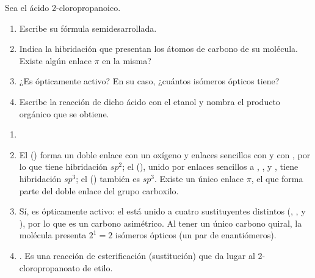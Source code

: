 \begin{exerciseEVAU}
    Sea el ácido 2-cloropropanoico.

    \begin{enumerate}[label=\letraminuscula]
        \item Escribe su fórmula semidesarrollada.
        \item Indica la hibridación que presentan los átomos de carbono de su molécula. Existe algún enlace \(\pi\) en la misma?
        \item ¿Es ópticamente activo? En su caso, ¿cuántos isómeros ópticos tiene?
        \item Escribe la reacción de dicho ácido con el etanol y nombra el producto orgánico que se obtiene.
    \end{enumerate}

    \begin{solu}
        \begin{enumerate}[label=\letraminuscula]
            \item {}

            \item El  () forma un doble enlace con un oxígeno y enlaces sencillos con  y con , por lo que tiene hibridación \(sp^2\); el  (), unido por enlaces sencillos a , ,  y , tiene hibridación \(sp^3\); el  () también es \(sp^3\). Existe un único enlace \(\pi\), el que forma parte del doble enlace  del grupo carboxilo.

            \item Sí, es ópticamente activo: el  está unido a cuatro sustituyentes distintos (, ,  y ), por lo que es un carbono asimétrico. Al tener un único carbono quiral, la molécula presenta \(2^1 = 2\) isómeros ópticos (un par de enantiómeros).

            \item {}. Es una reacción de esterificación (sustitución) que da lugar al 2-cloropropanoato de etilo.
        \end{enumerate}
    \end{solu}

\end{exerciseEVAU}

